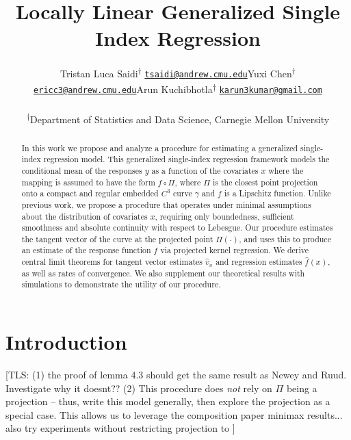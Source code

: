 \documentclass[11pt]{article}
\title{Locally Linear Generalized Single Index Regression}
\author{
\begin{tabular}{c c c}
\makecell[c]{Tristan Luca Saidi\textsuperscript{\(\dagger\)}\\
\href{mailto:tsaidi@andrew.cmu.edu}{\nolinkurl{tsaidi@andrew.cmu.edu}}}
&
\makecell[c]{Yuxi Chen\textsuperscript{\(\dagger\)}\\
\href{mailto:ericc3@andrew.cmu.edu}{\nolinkurl{ericc3@andrew.cmu.edu}}}
&
\makecell[c]{Arun Kuchibhotla\textsuperscript{\(\dagger\)}\\
\href{mailto:karun3kumar@gmail.com}
{\nolinkurl{karun3kumar@gmail.com}}}
\end{tabular}\\[0.75em]
\textsuperscript{\(\dagger\)}Department of Statistics and Data Science, Carnegie Mellon University
}
\newcommand{\tls}[1]{{\color{cyan}[TLS: #1]}}
\begin{document}

\maketitle

\begin{abstract}
    In this work we propose and analyze a procedure for estimating a generalized single-index regression model. This generalized single-index regression framework models the conditional mean of the responses $y$ as a function of the covariates $x$ where the mapping is assumed to have the form $f \circ \Pi$, where $\Pi$ is the closest point projection onto a compact and regular embedded $C^3$ curve $\gamma$ and $f$ is a Lipschitz function. Unlike previous work, we propose a procedure that operates under minimal assumptions about the distribution of covariates $x$, requiring only boundedness, sufficient smoothness and absolute continuity with respect to Lebesgue. Our procedure estimates the tangent vector of the curve at the projected point $\Pi(\cdot )$, and uses this to produce an estimate of the response function $f$ via projected kernel regression. We derive central limit theorems for tangent vector estimates $\hat{v}_x$ and regression estimates $\hat{f}(x)$, as well as rates of convergence. We also supplement our theoretical results with simulations to demonstrate the utility of our procedure.   
\end{abstract}

\tableofcontents

\section{Introduction}

\tls{(1) the proof of lemma 4.3 should get the same result as Newey and Ruud. Investigate why it doesnt?? (2) This procedure does \textit{not} rely on $\Pi$ being a projection -- thus, write this model generally, then explore the projection as a special case. This allows us to leverage the composition paper minimax results... also try experiments without restricting projection to }
\end{document}
